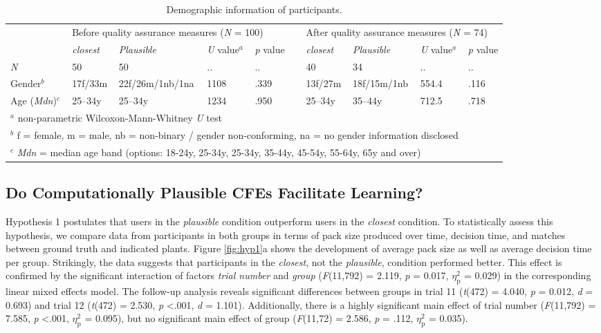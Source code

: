 \begin{table}
  \caption{Demographic information of participants.}
  \label{tab:participants}
\begin{tabular}{llllllllll} 
\toprule
    & \multicolumn{4}{l}{Before quality assurance measures (\textit{N} = 100)} && \multicolumn{4}{l}{After quality assurance measures (\textit{N} = 74)} \\
\cline{2-5}\cline{7-10}
    & \textit{closest} & \textit{Plausible} & \textit{U} value$^a$ & \textit{p} value && \textit{closest} & \textit{Plausible} & \textit{U} value$^a$ & \textit{p} value\\ 
\hline
\textit{N}   &  50 & 50 & .. & .. && 40 & 34 & .. & .. \\
Gender$^b$ & 17f/33m & 22f/26m/1nb/1na & 1108 & .339 && 13f/27m & 18f/15m/1nb & 554.4 & .116 \\
Age (\textit{Mdn})$^c$ & 25--34y & 25--34y & 1234 & .950 && 25--34y & 35--44y & 712.5 & .718 \\
\bottomrule
\multicolumn{9}{l}{$^a$ non-parametric Wilcoxon-Mann-Whitney \textit{U} test}\\
\multicolumn{9}{l}{$^b$ f = female, m = male, nb = non-binary / gender non-conforming, na = no gender information disclosed}\\
\multicolumn{9}{l}{$^c$ \textit{Mdn} = median age band (options: 18-24y, 25-34y, 25-34y, 35-44y, 45-54y, 55-64y, 65y and over)}
\end{tabular}
\end{table}

\subsection{Do Computationally Plausible CFEs Facilitate Learning?}

Hypothesis 1 postulates that users in the \textit{plausible} condition outperform users in the \textit{closest} condition.
To statistically assess this hypothesis, we compare data from participants in both groups in terms of pack size produced over time, decision time, and matches between ground truth and indicated plants.
Figure \ref{fig:hyp1}a shows the development of average pack size as well as average decision time per group. 
Strikingly, the data suggests that participants in the \textit{closest}, not the \textit{plausible}, condition performed better. 
This effect is confirmed by the significant interaction of factors \textit{trial number} and \textit{group} (\textit{F}(11,792) = 2.119, \textit{p} = 0.017, $\eta_{\text{p}}^{2}$ = 0.029) in the corresponding linear mixed effects model. The follow-up analysis reveals significant differences between groups in trial 11 (\textit{t}(472) = 4.040, \textit{p} = 0.012, \textit{d} = 0.693) and trial 12 (\textit{t}(472) = 2.530, \textit{p} \textless .001, \textit{d} = 1.101).
Additionally, there is a highly significant main effect of trial number (\textit{F}(11,792) = 7.585, \textit{p} \textless .001, $\eta_{\text{p}}^{2}$ = 0.095), but no significant main effect of group (\textit{F}(11,72) = 2.586, \textit{p} = .112, $\eta_{\text{p}}^{2}$ = 0.035).

